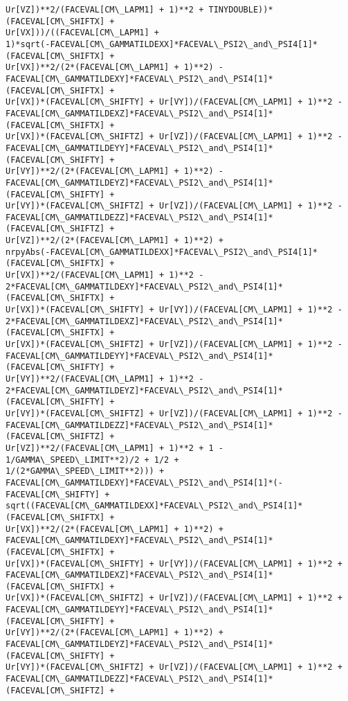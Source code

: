 \documentclass[landscape,letterpaper,10pt,english]{article}
\begin{document}
\begin{Verbatim}[commandchars=\\\{\}]
Ur[VZ])**2/(FACEVAL[CM\_LAPM1] + 1)**2 + TINYDOUBLE))*(FACEVAL[CM\_SHIFTX] +
Ur[VX]))/((FACEVAL[CM\_LAPM1] +
1)*sqrt(-FACEVAL[CM\_GAMMATILDEXX]*FACEVAL\_PSI2\_and\_PSI4[1]*(FACEVAL[CM\_SHIFTX] +
Ur[VX])**2/(2*(FACEVAL[CM\_LAPM1] + 1)**2) -
FACEVAL[CM\_GAMMATILDEXY]*FACEVAL\_PSI2\_and\_PSI4[1]*(FACEVAL[CM\_SHIFTX] +
Ur[VX])*(FACEVAL[CM\_SHIFTY] + Ur[VY])/(FACEVAL[CM\_LAPM1] + 1)**2 -
FACEVAL[CM\_GAMMATILDEXZ]*FACEVAL\_PSI2\_and\_PSI4[1]*(FACEVAL[CM\_SHIFTX] +
Ur[VX])*(FACEVAL[CM\_SHIFTZ] + Ur[VZ])/(FACEVAL[CM\_LAPM1] + 1)**2 -
FACEVAL[CM\_GAMMATILDEYY]*FACEVAL\_PSI2\_and\_PSI4[1]*(FACEVAL[CM\_SHIFTY] +
Ur[VY])**2/(2*(FACEVAL[CM\_LAPM1] + 1)**2) -
FACEVAL[CM\_GAMMATILDEYZ]*FACEVAL\_PSI2\_and\_PSI4[1]*(FACEVAL[CM\_SHIFTY] +
Ur[VY])*(FACEVAL[CM\_SHIFTZ] + Ur[VZ])/(FACEVAL[CM\_LAPM1] + 1)**2 -
FACEVAL[CM\_GAMMATILDEZZ]*FACEVAL\_PSI2\_and\_PSI4[1]*(FACEVAL[CM\_SHIFTZ] +
Ur[VZ])**2/(2*(FACEVAL[CM\_LAPM1] + 1)**2) +
nrpyAbs(-FACEVAL[CM\_GAMMATILDEXX]*FACEVAL\_PSI2\_and\_PSI4[1]*(FACEVAL[CM\_SHIFTX] +
Ur[VX])**2/(FACEVAL[CM\_LAPM1] + 1)**2 -
2*FACEVAL[CM\_GAMMATILDEXY]*FACEVAL\_PSI2\_and\_PSI4[1]*(FACEVAL[CM\_SHIFTX] +
Ur[VX])*(FACEVAL[CM\_SHIFTY] + Ur[VY])/(FACEVAL[CM\_LAPM1] + 1)**2 -
2*FACEVAL[CM\_GAMMATILDEXZ]*FACEVAL\_PSI2\_and\_PSI4[1]*(FACEVAL[CM\_SHIFTX] +
Ur[VX])*(FACEVAL[CM\_SHIFTZ] + Ur[VZ])/(FACEVAL[CM\_LAPM1] + 1)**2 -
FACEVAL[CM\_GAMMATILDEYY]*FACEVAL\_PSI2\_and\_PSI4[1]*(FACEVAL[CM\_SHIFTY] +
Ur[VY])**2/(FACEVAL[CM\_LAPM1] + 1)**2 -
2*FACEVAL[CM\_GAMMATILDEYZ]*FACEVAL\_PSI2\_and\_PSI4[1]*(FACEVAL[CM\_SHIFTY] +
Ur[VY])*(FACEVAL[CM\_SHIFTZ] + Ur[VZ])/(FACEVAL[CM\_LAPM1] + 1)**2 -
FACEVAL[CM\_GAMMATILDEZZ]*FACEVAL\_PSI2\_and\_PSI4[1]*(FACEVAL[CM\_SHIFTZ] +
Ur[VZ])**2/(FACEVAL[CM\_LAPM1] + 1)**2 + 1 - 1/GAMMA\_SPEED\_LIMIT**2)/2 + 1/2 +
1/(2*GAMMA\_SPEED\_LIMIT**2))) +
FACEVAL[CM\_GAMMATILDEXY]*FACEVAL\_PSI2\_and\_PSI4[1]*(-FACEVAL[CM\_SHIFTY] +
sqrt((FACEVAL[CM\_GAMMATILDEXX]*FACEVAL\_PSI2\_and\_PSI4[1]*(FACEVAL[CM\_SHIFTX] +
Ur[VX])**2/(2*(FACEVAL[CM\_LAPM1] + 1)**2) +
FACEVAL[CM\_GAMMATILDEXY]*FACEVAL\_PSI2\_and\_PSI4[1]*(FACEVAL[CM\_SHIFTX] +
Ur[VX])*(FACEVAL[CM\_SHIFTY] + Ur[VY])/(FACEVAL[CM\_LAPM1] + 1)**2 +
FACEVAL[CM\_GAMMATILDEXZ]*FACEVAL\_PSI2\_and\_PSI4[1]*(FACEVAL[CM\_SHIFTX] +
Ur[VX])*(FACEVAL[CM\_SHIFTZ] + Ur[VZ])/(FACEVAL[CM\_LAPM1] + 1)**2 +
FACEVAL[CM\_GAMMATILDEYY]*FACEVAL\_PSI2\_and\_PSI4[1]*(FACEVAL[CM\_SHIFTY] +
Ur[VY])**2/(2*(FACEVAL[CM\_LAPM1] + 1)**2) +
FACEVAL[CM\_GAMMATILDEYZ]*FACEVAL\_PSI2\_and\_PSI4[1]*(FACEVAL[CM\_SHIFTY] +
Ur[VY])*(FACEVAL[CM\_SHIFTZ] + Ur[VZ])/(FACEVAL[CM\_LAPM1] + 1)**2 +
FACEVAL[CM\_GAMMATILDEZZ]*FACEVAL\_PSI2\_and\_PSI4[1]*(FACEVAL[CM\_SHIFTZ] +

\end{Verbatim}
\end{document}
